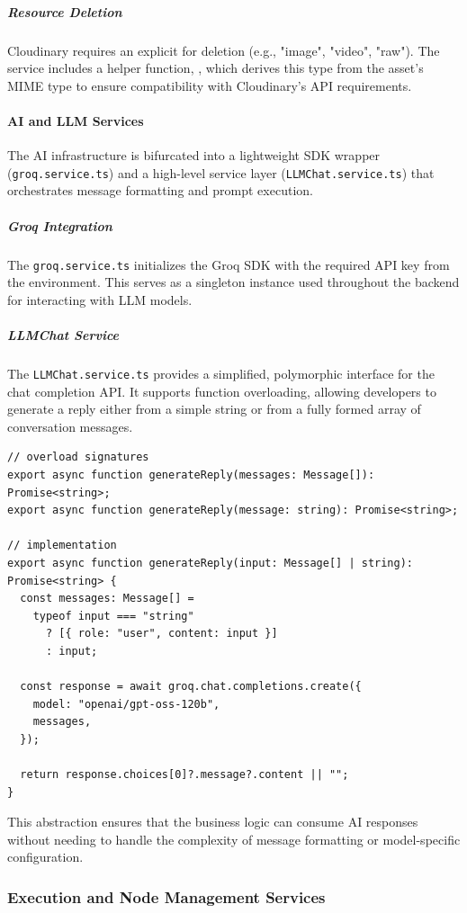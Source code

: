 \subparagraph{Resource Deletion}
Cloudinary requires an explicit \texttt{} for deletion (e.g., "image", "video", "raw"). The service includes a helper function, \texttt{}, which derives this type from the asset's MIME type to ensure compatibility with Cloudinary's API requirements.

\paragraph{AI and LLM Services}
The AI infrastructure is bifurcated into a lightweight SDK wrapper (\texttt{groq.service.ts}) and a high-level service layer (\texttt{LLMChat.service.ts}) that orchestrates message formatting and prompt execution.

\subparagraph{Groq Integration}
The \texttt{groq.service.ts} initializes the Groq SDK with the required API key from the environment. This serves as a singleton instance used throughout the backend for interacting with LLM models.

\subparagraph{LLMChat Service}
The \texttt{LLMChat.service.ts} provides a simplified, polymorphic interface for the chat completion API. It supports function overloading, allowing developers to generate a reply either from a simple string or from a fully formed array of conversation messages.

\begin{lstlisting}[caption={LLM Chat service with polymorphic input (\texttt{LLMChat.service.ts})}]
// overload signatures
export async function generateReply(messages: Message[]): Promise<string>; 
export async function generateReply(message: string): Promise<string>; 

// implementation
export async function generateReply(input: Message[] | string): Promise<string> {
  const messages: Message[] =
    typeof input === "string"
      ? [{ role: "user", content: input }]
      : input;

  const response = await groq.chat.completions.create({
    model: "openai/gpt-oss-120b", 
    messages,
  });

  return response.choices[0]?.message?.content || "";
}
\end{lstlisting}

This abstraction ensures that the business logic can consume AI responses without needing to handle the complexity of message formatting or model-specific configuration.

\subsubsection{Execution and Node Management Services}

